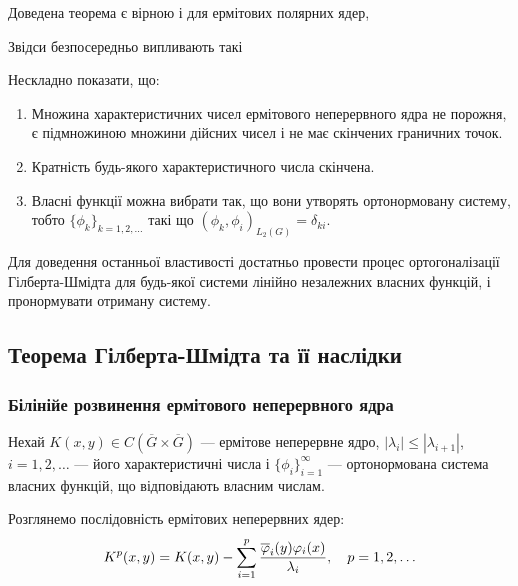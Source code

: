 \begin{remark}
	Доведена теорема є вірною і для ермітових полярних ядер,
\end{remark}

Звідси безпосередньо випливають такі 
\begin{properties}
	Нескладно показати, що:
	\begin{enumerate}
		\item Множина характеристичних чисел ермітового неперервного \allowbreak ядра не порожня, є підмножиною множини дійсних чисел і не має скінчених граничних точок.
		\item Кратність будь-якого характеристичного числа скінчена.
		\item Власні функції можна вибрати так, що вони утворять ортонормовану систему, тобто $\{ \phi_k\}_{k = 1, 2, \ldots}$ такі що $(\phi_k, \phi_i)_{L_2(G)} = \delta_{ki}$.
	\end{enumerate}
\end{properties}

\begin{remark}
	Для доведення останньої властивості достатньо провести процес ортогоналізації Гілберта-Шмідта для будь-якої системи лінійно незалежних власних функцій, і пронормувати отриману систему.
\end{remark}

\subsection{Теорема Гілберта-Шмідта та її наслідки}

\subsubsection{Білінійе розвинення ермітового неперервного ядра}

Нехай $K(x, y) \in C\left(\overline G \times \overline G\right)$ --- ермітове неперервне ядро, $|\lambda_i| \le |\lambda_{i + 1}|$, $i = 1, 2, \ldots$ --- його характеристичні числа і $\{\phi_i\}_{i = 1}^\infty$ --- ортонормована система власних функцій, що відповідають власним числам. \medskip

Розглянемо послідовність ермітових неперервних ядер:
\begin{equation}
	K^p(x, y) = K(x, y) - \displaystyle\sum\limits_{i = 1}^p \dfrac{\overline {\varphi}_i(y) \varphi_i(x)}{\lambda_i}, \quad p = 1, 2, \ldots
\end{equation}

